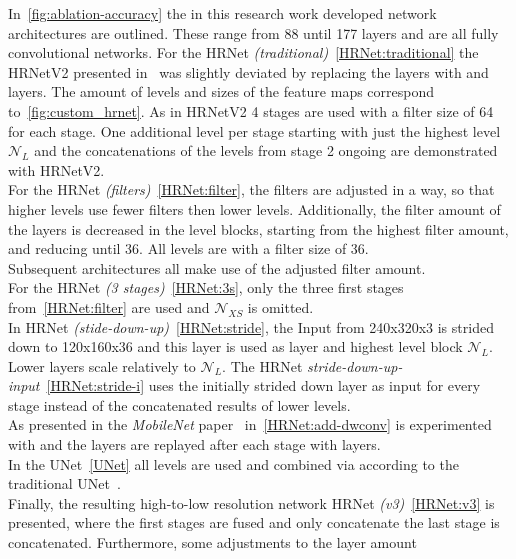 In~\ref{fig:ablation-accuracy} the in this research work developed network architectures are outlined.
These range from 88 until 177 layers and are
all fully convolutional networks.
For the HRNet \textit{(traditional)}~\ref{HRNet:traditional} the HRNetV2 presented in~\cite{HRNetv2} was slightly deviated
by replacing the 
layers with  and  layers.
The amount of levels and sizes of the feature maps correspond to~\ref{fig:custom_hrnet}.
As in HRNetV2 4 stages are used with a filter size of 64 for each stage.
One additional level per stage starting with just the highest level $\mathcal{N}_L$
and the concatenations of the levels from stage 2 ongoing are demonstrated with HRNetV2.\\
For the HRNet \textit{(filters)}~\ref{HRNet:filter}, the filters are adjusted in a way, so that higher levels use fewer filters then lower levels.
Additionally, the filter amount of the  layers is decreased in the level blocks, starting from the highest filter
amount, and reducing until 36.
All levels are  with a filter size of 36.\\
Subsequent architectures all make use of the adjusted filter amount.\\
For the HRNet \textit{(3 stages)}~\ref{HRNet:3s}, only the three first stages from~\ref{HRNet:filter} are used and
$\mathcal{N}_{XS}$ is omitted.\\
In HRNet \textit{(stide-down-up)}~\ref{HRNet:stride}, the Input from 240x320x3 is strided down to 120x160x36 and this layer is used as  layer
and highest level block $\mathcal{N}_L$. Lower layers scale relatively to $\mathcal{N}_L$.
The HRNet \textit{stride-down-up-input}~\ref{HRNet:stride-i} uses the initially strided down  layer as input for
every stage instead of the concatenated results of lower levels.\\
As presented in the \textit{MobileNet} paper~\cite{mobilenet} in~\ref{HRNet:add-dwconv}  is experimented with
and the  layers are replayed after each stage with  layers.\\
In the UNet~\ref{UNet} all levels are used and combined via  according to the traditional UNet~\cite{unet}.\\
Finally, the resulting high-to-low resolution network HRNet \textit{(v3)}~\ref{HRNet:v3} is presented, where
the first stages are fused and only concatenate the last stage is concatenated. Furthermore, some adjustments to the layer amount
